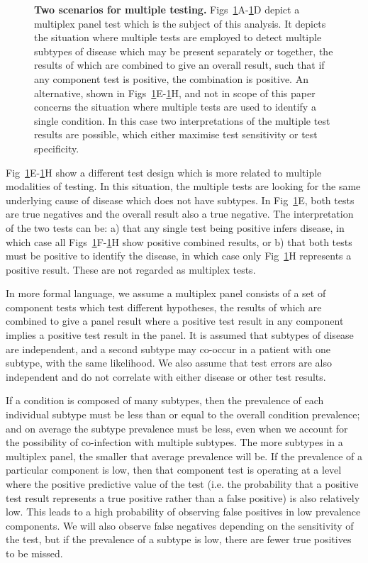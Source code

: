 \documentclass[10pt,letterpaper]{article}
\begin{document}
\begin{figure}[!ht]
\caption{{\bf Two scenarios for multiple testing.}
Figs~\ref{fig1}A-\ref{fig1}D depict a multiplex panel test which is the subject of this analysis. It depicts the situation where multiple tests are employed to detect multiple subtypes of disease which may be present separately or together, the results of which are combined to give an overall result, such that if any component test is positive, the combination is positive. An alternative, shown in Figs~\ref{fig1}E-\ref{fig1}H, and not in scope of this paper concerns the situation where multiple tests are used to identify a single condition. In this case two interpretations of the multiple test results are possible, which either maximise test sensitivity or test specificity.}
\label{fig1}
\end{figure}

Fig~\ref{fig1}E-\ref{fig1}H show a different test design which is more related to multiple modalities of testing\cite{weinstein2005}. In this situation, the multiple tests are looking for the same underlying cause of disease which does not have subtypes. In Fig~\ref{fig1}E, both tests are true negatives and the overall result also a true negative. The interpretation of the two tests can be: a) that any single test being positive infers disease, in which case all Figs~\ref{fig1}F-\ref{fig1}H show positive combined results, or b) that both tests must be positive to identify the disease, in which case only Fig~\ref{fig1}H represents a positive result. These are not regarded as multiplex tests.

In more formal language, we assume a multiplex panel consists of a set of component tests which test different hypotheses, the results of which are combined to give a panel result where a positive test result in any component implies a positive test result in the panel. It is assumed that subtypes of disease are independent, and a second subtype may co-occur in a patient with one subtype, with the same likelihood. We also assume that test errors are also independent and do not correlate with either disease or other test results.

If a condition is composed of many subtypes, then the prevalence of each individual subtype must be less than or equal to the overall condition prevalence; and on average the subtype prevalence must be less, even when we account for the possibility of co-infection with multiple subtypes. The more subtypes in a multiplex panel, the smaller that average prevalence will be. If the prevalence of a particular component is low, then that component test is operating at a level where the positive predictive value of the test (i.e. the probability that a positive test result represents a true positive rather than a false positive) is also relatively low. This leads to a high probability of observing false positives in low prevalence components. We will also observe false negatives depending on the sensitivity of the test, but if the prevalence of a subtype is low, there are fewer true positives to be missed.
\end{document}
